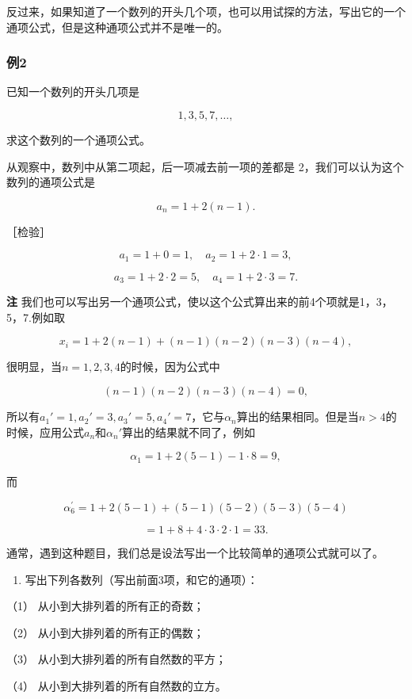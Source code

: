 反过来，如果知道了一个数列的开头几个项，也可以用试探的方法，写出它的一个通项公式，但是这种通项公式并不是唯一的。

\subsubsection{例2}

已知一个数列的开头几项是

\[
1, 3, 5, 7, \dots,
\]

求这个数列的一个通项公式。

 从观察中，数列中从第二项起，后一项减去前一项的差都是
2，我们可以认为这个数列的通项公式是

\[
a_{n} = 1 + 2 (n - 1).
\]

［检验］

\[
a_{1} = 1 + 0 = 1, \quad a_{2} = 1 + 2 \cdot 1 = 3,
\]

\[
a_{3} = 1 + 2 \cdot 2 = 5, \quad a_{4} = 1 + 2 \cdot 3 = 7.
\]

\textbf{注}
我们也可以写出另一个通项公式，使以这个公式算出来的前4个项就是1，3，5，7.例如取

\[
x_{i} = 1 + 2 (n - 1) + (n - 1) (n - 2) (n - 3) (n - 4),
\]

很明显，当\(n = 1,2,3,4\)的时候，因为公式中

\[
(n - 1) (n - 2) (n - 3) (n - 4) = 0,
\]

所以有\(a_1' = 1, a_2' = 3, a_3' = 5, a_4' = 7\)，它与\(\alpha_n\)算出的结果相同。但是当\(n > 4\)的时候，应用公式\(a_n\)和\(\alpha_n'\)算出的结果就不同了，例如

\[
\alpha_{1} = 1 + 2 (5 - 1) - 1 \cdot 8 = 9,
\]

而

\[
\alpha_{6}^{\prime} = 1 + 2 (5 - 1) + (5 - 1) (5 - 2) (5 - 3) (5 - 4)
\]

\[
= 1 + 8 + 4 \cdot 3 \cdot 2 \cdot 1 = 33.
\]

通常，遇到这种题目，我们总是设法写出一个比较简单的通项公式就可以了。

\begin{enumerate}
\item
  写出下列各数列（写出前面3项，和它的通项）：
\end{enumerate}

（1） 从小到大排列着的所有正的奇数；

（2） 从小到大排列着的所有正的偶数；

（3） 从小到大排列着的所有自然数的平方；

（4） 从小到大排列着的所有自然数的立方。

